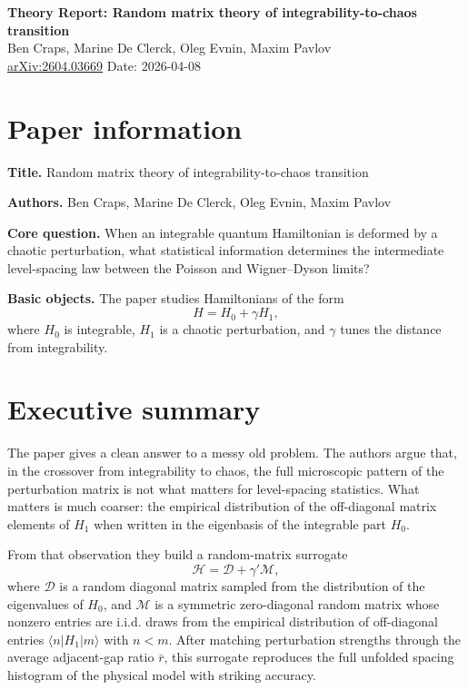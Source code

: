 \documentclass[11pt]{article}
\begin{document}
\begin{center}
{\LARGE \textbf{Theory Report: Random matrix theory of integrability-to-chaos transition}}\\[0.4em]
{\large Ben Craps, Marine De Clerck, Oleg Evnin, Maxim Pavlov}\\[0.25em]
\href{https://arxiv.org/abs/2604.03669}{arXiv:2604.03669} \hspace{1em} Date: 2026-04-08
\end{center}

\section*{Paper information}
\textbf{Title.} Random matrix theory of integrability-to-chaos transition

\textbf{Authors.} Ben Craps, Marine De Clerck, Oleg Evnin, Maxim Pavlov

\textbf{Core question.} When an integrable quantum Hamiltonian is deformed by a chaotic perturbation, what statistical information determines the intermediate level-spacing law between the Poisson and Wigner--Dyson limits?

\textbf{Basic objects.} The paper studies Hamiltonians of the form
\[
H = H_0 + \gamma H_1,
\]
where $H_0$ is integrable, $H_1$ is a chaotic perturbation, and $\gamma$ tunes the distance from integrability.

\section*{Executive summary}
The paper gives a clean answer to a messy old problem. The authors argue that, in the crossover from integrability to chaos, the full microscopic pattern of the perturbation matrix is not what matters for level-spacing statistics. What matters is much coarser: the empirical distribution of the off-diagonal matrix elements of $H_1$ when written in the eigenbasis of the integrable part $H_0$.

From that observation they build a random-matrix surrogate
\[
\mathcal H = \mathcal D + \gamma' \mathcal M,
\]
where $\mathcal D$ is a random diagonal matrix sampled from the distribution of the eigenvalues of $H_0$, and $\mathcal M$ is a symmetric zero-diagonal random matrix whose nonzero entries are i.i.d. draws from the empirical distribution of off-diagonal entries $\langle n|H_1|m\rangle$ with $n<m$. After matching perturbation strengths through the average adjacent-gap ratio $\bar r$, this surrogate reproduces the full unfolded spacing histogram of the physical model with striking accuracy.
\end{document}
